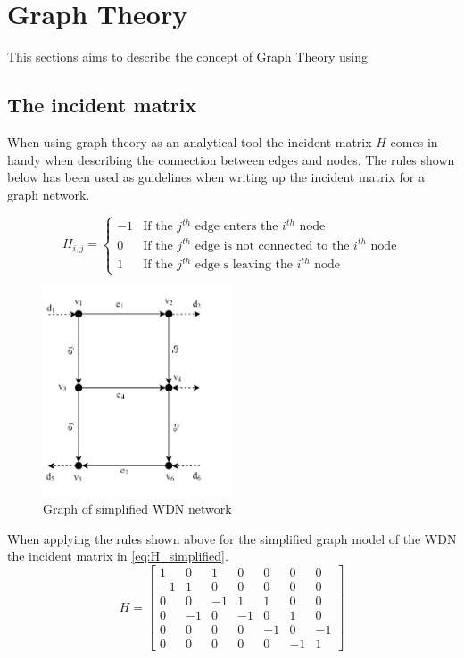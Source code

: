 \section{Graph Theory}
This sections aims to describe the concept of Graph Theory using 
\subsection{The incident matrix}
When using graph theory as an analytical tool the incident matrix $H$ comes in handy when describing the connection between edges and nodes. The rules shown below has been used as guidelines when writing up the incident matrix for a graph network. 

\begin{equation*}
H_{i,j} = \begin{cases}
    -1 & \text{If the $j^{th}$ edge enters the $i^{th}$ node} \\
    0 & \text{If the $j^{th}$ edge is not connected to the $i^{th}$ node} \\
    1 & \text{If the $j^{th}$ edge s leaving the $i^{th}$ node}
\end{cases}
\end{equation*} %

\begin{figure}[h!]
    \centering
    \includegraphics[width=0.5\textwidth]{MathiasTest/Pictures/Graph.png}
    \caption{Graph of simplified WDN network}
    \label{fig:Graph
    }
\end{figure}

When applying the rules shown above for the simplified graph model of the WDN the incident matrix in \eqref{eq:H_simplified}.
\begin{equation}
    H = \begin{bmatrix}
1 & 0 & 1 & 0 & 0 & 0 & 0\\
-1 & 1 & 0 & 0 & 0 & 0 & 0\\
0 & 0 & -1 & 1 & 1 & 0 & 0\\
0 & -1 & 0 & -1 & 0 & 1 & 0\\
0 & 0 & 0 & 0 & -1 &  0  & -1\\
0 & 0 & 0 & 0 & 0 & -1 & 1
\end{bmatrix}
\label{eq:H_simplified}
\end{equation} %

